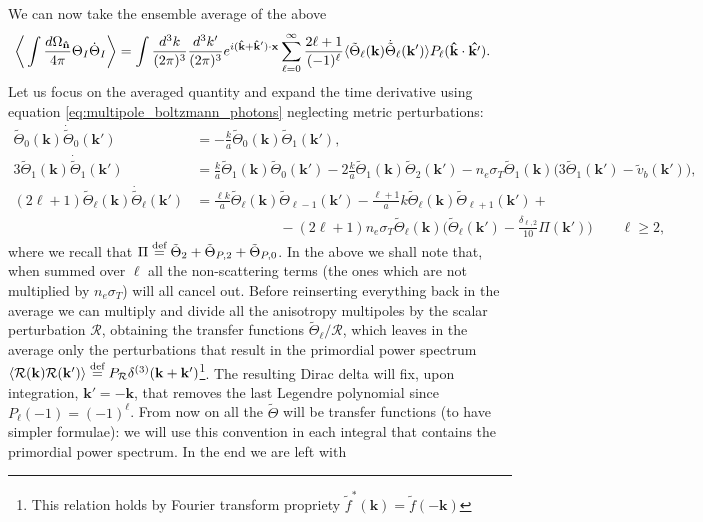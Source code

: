 We can now take the ensemble average of the above
\begin{align*}
    \bigg\langle\int\frac{d\Omega_{\mathbf{\hat{n}}}}{4\pi}\Theta_I\dot \Theta_I\bigg\rangle&=\int\frac{d^3k}{(2\pi)^3}\frac{d^3k'}{(2\pi)^3}e^{i(\mathbf{\hat{k}}+\mathbf{\hat{k}}')\cdot\mathbf{x}}\sum_{\ell=0}^{\infty}\frac{2\ell+1}{(-1)^{\ell}}\langle\tilde\Theta_\ell(\mathbf{k})\dot{\tilde\Theta}_{\ell}(\mathbf{k}')\rangle P_\ell(\mathbf{\hat{k}}\cdot\mathbf{\hat{k'}}).
\end{align*}
Let us focus on the averaged quantity and expand the time derivative using equation \eqref{eq:multipole_boltzmann_photons} neglecting metric perturbations:
\begin{align*}
    \tilde\Theta_0(\mathbf{k})\dot{\tilde\Theta}_{0}(\mathbf{k}')&=-\frac{k}{a}\tilde\Theta_0(\mathbf{k})\tilde\Theta_1(\mathbf{k}'),&&\\
    3\tilde\Theta_1(\mathbf{k})\dot{\tilde\Theta}_{1}(\mathbf{k}')&=\frac{k}{a}\tilde\Theta_1(\mathbf{k})\tilde\Theta_0(\mathbf{k}')-2\frac{k}{a}\tilde\Theta_1(\mathbf{k})\tilde\Theta_2(\mathbf{k}')-n_e\sigma_T\tilde\Theta_1(\mathbf{k})\bigg( 3\tilde\Theta_1(\mathbf{k}')-\tilde v_b(\mathbf{k}') \bigg),&&\\
    (2\ell+1)\tilde\Theta_\ell(\mathbf{k})\dot{\tilde\Theta}_{\ell}(\mathbf{k}')&=\frac{\ell k}{a}\tilde\Theta_\ell(\mathbf{k})\tilde\Theta_{\ell-1}(\mathbf{k}')-\frac{\ell+1}{a}k\tilde\Theta_\ell(\mathbf{k})\tilde\Theta_{\ell+1}(\mathbf{k}')+\\&\qquad\qquad\qquad-(2\ell+1)n_e\sigma_T\tilde\Theta_\ell(\mathbf{k})\bigg(\tilde\Theta_\ell(\mathbf{k}')-\frac{\delta_{\ell,2}}{10}\Pi(\mathbf{k}')\bigg)\qquad\ell\geq2,&&
\end{align*}
where we recall that $\Pi\stackrel{\text{def}}{=}\tilde\Theta_2+\tilde\Theta_{P,2}+\tilde\Theta_{P,0}$. In the above we shall note that, when summed over $\ell$ all the non-scattering terms (the ones which are not multiplied by $n_e\sigma_T$) will all cancel out. Before reinserting everything back in the average we can multiply and divide all the anisotropy multipoles by the scalar perturbation $\mathcal{R}$, obtaining the transfer functions $\tilde\Theta_\ell/\mathcal{R}$, which leaves in the average only the perturbations that result in the primordial power spectrum $\langle\mathcal{R}(\mathbf{k}) \mathcal{R}(\mathbf{k}') \rangle\stackrel{\text{def}}{=} {P}_\mathcal{R} \delta^{(3)}(\mathbf{k}+\mathbf{k'})$\footnote{This relation holds by Fourier transform propriety $\tilde f^*(\mathbf{k})=\tilde f(-\mathbf{k})$}. The resulting Dirac delta will fix, upon integration, $\mathbf{k}'=-\mathbf{k}$, that removes the last Legendre polynomial since $P_\ell(-1)=(-1)^\ell$. From now on all the $\tilde\Theta$ will be transfer functions (to have simpler formulae): we will use this convention in each integral that contains the primordial power spectrum. In the end we are left with
